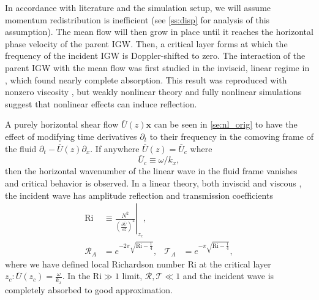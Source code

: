 \documentclass[
        fleqn,
        usenatbib,
    ]{mnras}
\newcommand*{\pd}[2]{\frac{\partial#1}{\partial#2}}
\newcommand*{\at}[1]{\left.#1\right|}
\newcommand*{\p}[1]{\left(#1\right)}
\newcommand*{\bm}[1]{\boldsymbol{\mathbf{#1}}}
\begin{document}
In accordance with literature and the simulation setup, we will assume momentum
redistribution is inefficient (see \autoref{ss:disp} for analysis of this
assumption). The mean flow will then grow in place until it reaches the
horizontal phase velocity of the parent IGW\@. Then, a critical layer forms at
which the frequency of the incident IGW is Doppler-shifted to zero. The
interaction of the parent IGW with the mean flow was first studied in the
inviscid, linear regime in \citep{booker_bretherton}, which found nearly
complete absorption. This result was reproduced with nonzero viscosity
\citep{hazel}, but weakly nonlinear theory \citep{brown_stewartson} and fully
nonlinear simulations \citep{winters1994} suggest that nonlinear effects can
induce reflection.

A purely horizontal shear flow $\overline{U}(z) \bm{x}$ can be seen in
\autoref{se:nl_orig} to have the effect of modifying time derivatives
$\partial_t$ to their frequency in the comoving frame of the fluid $\partial_t -
\overline{U}(z)\partial_x$. If anywhere $\overline{U}(z) = \overline{U}_c$ where
\begin{equation}
    \overline{U}_c \equiv \omega / k_x,\label{eq:u_c}
\end{equation}
then the horizontal wavenumber of the linear wave in the fluid frame vanishes
and critical behavior is observed. In a linear theory, both inviscid
\citep{booker_bretherton} and viscous \citep{hazel}, the incident wave has
amplitude reflection and transmission coefficients
\begin{align}
    \mathrm{Ri} &\equiv \at{\frac{N^2}{\p{\pd{\overline{U}}{z}}^2}}_{z_c},
        \label{eq:ri_def}\\
    \mathcal{R}_A &= e^{-2\pi \sqrt{\mathrm{Ri} - \frac{1}{4}}}, &
    \mathcal{T}_A &= e^{-\pi \sqrt{\mathrm{Ri} - \frac{1}{4}}},
        \label{eq:crit_coeffs}
\end{align}
where we have defined local Richardson number Ri at the critical layer $z_c:
\overline{U}(z_c) = \frac{\omega}{k_{x}}$. In the $\mathrm{Ri} \gg 1$ limit,
$\mathcal{R}, \mathcal{T} \ll 1$ and the incident wave is completely absorbed to
good approximation.
\end{document}
